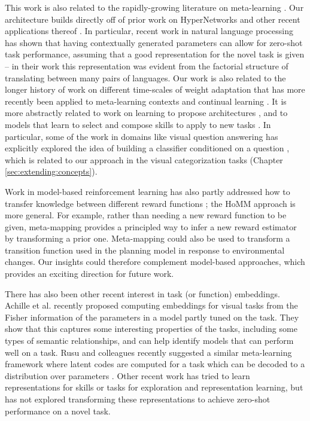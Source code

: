 This work is also related to the rapidly-growing literature on meta-learning \citep[e.g.][]{Vinyals2016, Santoro2016, Finn2017a, Finn2018, Stadie2018, Botvinick2019, Ravichandran2019}. Our architecture builds directly off of prior work on HyperNetworks \citep{Ha2016} and other recent applications thereof  \citep[e.g.][]{Brock2018a, Zhang2019, Li2019a, Rusu2019}. In particular, recent work in natural language processing has shown that having contextually generated parameters can allow for zero-shot task performance, assuming that a good representation for the novel task is given \citep{Platanios2017} -- in their work this representation was evident from the factorial structure of translating between many pairs of languages. Our work is also related to the longer history of work on different time-scales of weight adaptation \citep{Hinton1982, Kumaran2016} that has more recently been applied to meta-learning contexts \citep[e.g.][]{Ba2016, Munkhdalai2017, Garnelo2018} and continual learning \citep[e.g.]{Hu2019}. It is more abstractly related to work on learning to propose architectures \citep[e.g.][]{Zoph2016, Cao2019}, and to models that learn to select and compose skills to apply to new tasks \citep[e.g.][]{Andreas, Andreas2016, Tessler2016, Reed2015, Chang2019a}. In particular, some of the work in domains like visual question answering has explicitly explored the idea of building a classifier conditioned on a question \citep{Andreas, Andreasa}, which is related to our approach in the visual categorization tasks (Chapter \ref{sec:extending:concepts}).

Work in model-based reinforcement learning has also partly addressed how to transfer knowledge between different reward functions \citep[e.g.][]{Laroche2017}; the HoMM approach is more general. For example, rather than needing a new reward function to be given, meta-mapping provides a principled way to infer a new reward estimator by transforming a prior one. Meta-mapping could also be used to transform a transition function used in the planning model in response to environmental changes. Our insights could therefore complement model-based approaches, which provides an exciting direction for future work.

There has also been other recent interest in task (or function) embeddings. Achille et al. \citep{Achille2019} recently proposed computing embeddings for visual tasks from the Fisher information of the parameters in a model partly tuned on the task. They show that this captures some interesting properties of the tasks, including some types of semantic relationships, and can help identify models that can perform well on a task. Rusu and colleagues recently suggested a similar meta-learning framework where latent codes are computed for a task which can be decoded to a distribution over parameters \citep{Rusu2019}. Other recent work has tried to learn representations for skills \citep[e.g.][]{Eysenbach2019} or tasks \citep[e.g.]{Hsu2019} for exploration and representation learning, but has not explored transforming these representations to achieve zero-shot performance on a novel task.

